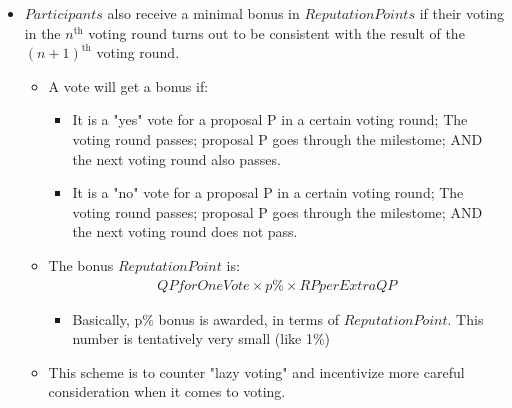 \documentclass[11pt,a4paper,titlepage]{article}
\begin{document}
{{\begin{itemize}
			\item $Participants$ also receive a minimal bonus in $Reputation Points$ if their voting in the $n^\text{th}$ voting round turns out to be consistent with the result of the $(n+1)^\text{th}$ voting round.
			\begin{itemize}
				\item A vote will get a bonus if:
				\begin{itemize}
					\item It is a "yes" vote for a proposal P in a certain voting round; The voting round passes; proposal P goes through the milestome; AND the next voting round also passes.
					\item It is a "no" vote for a proposal P in a certain voting round; The voting round passes; proposal P goes through the milestome; AND the next voting round does not pass.
				\end{itemize}
				\item The bonus $Reputation Point$ is:
				\begin{align}
					QPforOneVote \times p\% \times RPperExtraQP
				\end{align}
				\begin{itemize}
					\item Basically, p\% bonus is awarded, in terms of $Reputation Point$. This number is tentatively very small (like 1\%)
				\end{itemize}
				\item This scheme is to counter "lazy voting" and incentivize more careful consideration when it comes to voting.
			\end{itemize}
		\end{itemize}
	}
	
}
\end{document}
